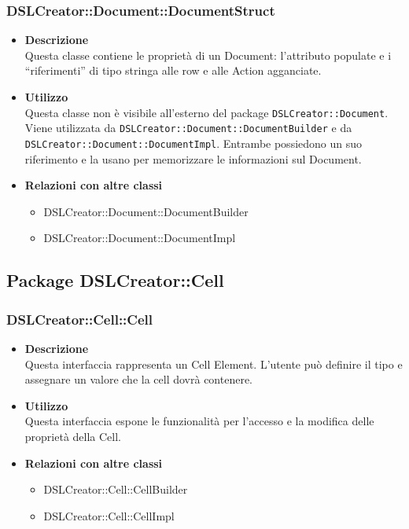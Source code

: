  \subsubsection{DSLCreator::Document::DocumentStruct}
                    \begin{itemize}
                        \item \textbf{Descrizione} \hfill \\
                            Questa classe contiene le proprietà di un Document: l'attributo populate e i ``riferimenti'' di tipo stringa alle row e alle Action agganciate. 
                        \item \textbf{Utilizzo} \hfill \\
                            Questa classe non è visibile all'esterno del package \texttt{DSLCreator::Document}. Viene utilizzata da \texttt{DSLCreator::Document::DocumentBuilder} e da \texttt{DSLCrea\-tor::Document::DocumentImpl}. Entrambe possiedono un suo riferimento e la usano per memorizzare le informazioni sul Document.
                        \item \textbf{Relazioni con altre classi}
                            \begin{itemize}
                              \item DSLCreator::Document::DocumentBuilder
                              \item DSLCreator::Document::DocumentImpl
                            \end{itemize}
                    \end{itemize}

\subsection{Package DSLCreator::Cell}
 \subsubsection{DSLCreator::Cell::Cell}
                    \begin{itemize}
                        \item \textbf{Descrizione} \hfill \\
                            Questa interfaccia rappresenta un Cell Element. L'utente può definire il tipo e assegnare un valore che la cell dovrà contenere.
                        \item \textbf{Utilizzo} \hfill \\
                            Questa interfaccia espone le funzionalità per l'accesso e la modifica delle proprietà della Cell.
                        \item \textbf{Relazioni con altre classi}
                            \begin{itemize}
                              \item DSLCreator::Cell::CellBuilder
                              \item DSLCreator::Cell::CellImpl
                            \end{itemize}
                    \end{itemize}

